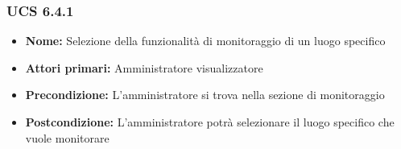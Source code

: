 \subsubsection{UCS 6.4.1}
\begin{itemize}
\item \textbf{Nome:} Selezione della funzionalità di monitoraggio di un luogo specifico
\item \textbf{Attori primari:} Amministratore visualizzatore
\item \textbf{Precondizione:} L'amministratore si trova nella sezione di monitoraggio
\item \textbf{Postcondizione:} L'amministratore potrà selezionare il luogo specifico che vuole monitorare
\end{itemize}



